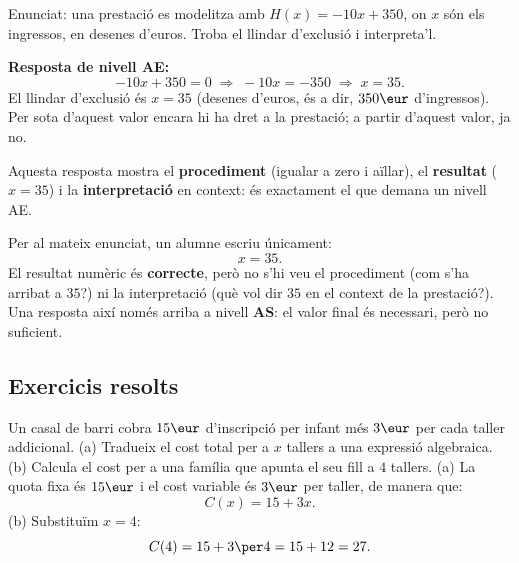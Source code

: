 \begin{exemple}
Enunciat: una prestació es modelitza amb $H(x)=-10x+350$, on $x$ són els
ingressos, en desenes d'euros. Troba el llindar d'exclusió i interpreta'l.

\medskip
\noindent\textbf{Resposta de nivell AE:}
\[
-10x+350=0 \;\Longrightarrow\; -10x=-350 \;\Longrightarrow\; x=35.
\]
El llindar d'exclusió és $x=35$ (desenes d'euros, és a dir, $350\eur$
d'ingressos). Per sota d'aquest valor encara hi ha dret a la prestació;
a partir d'aquest valor, ja no.

Aquesta resposta mostra el \textbf{procediment} (igualar a zero i
aïllar), el \textbf{resultat} ($x=35$) i la \textbf{interpretació} en
context: és exactament el que demana un nivell AE.
\end{exemple}

\begin{exemple}
Per al mateix enunciat, un alumne escriu únicament:
\[
x=35.
\]
El resultat numèric és \textbf{correcte}, però no s'hi veu el
procediment (com s'ha arribat a $35$?) ni la interpretació (què vol dir
$35$ en el context de la prestació?). Una resposta així només arriba a
nivell \textbf{AS}: el valor final és necessari, però no suficient.
\end{exemple}

\subsection{Exercicis resolts}

\begin{exresolt}
Un casal de barri cobra $15\eur$ d'inscripció per infant més $3\eur$ per
cada taller addicional. (a) Tradueix el cost total per a $x$ tallers a
una expressió algebraica. (b) Calcula el cost per a una família que
apunta el seu fill a $4$ tallers.
\solucio
(a) La quota fixa és $15\eur$ i el cost variable és $3\eur$ per taller,
de manera que:
\[
C(x) = 15 + 3x.
\]
(b) Substituïm $x=4$:
\[
C(4) = 15+3\per4 = 15+12 = 27.
\]
\end{exresolt}

